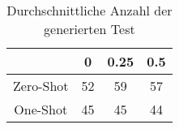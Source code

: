 \bgroup
\def\arraystretch{2}
\begin{table}[H]
	\vspace{.5cm}
	\centering		
	\begin{center}
		\begin{tabular}{|c||c|c|c|}
			\hline 
			& 0 & 0.25 & 0.5 \\
			\hline 
			\hline
			Zero-Shot & 52 & 59 & 57 \\
			\hline
			One-Shot & 45 & 45 & 44 \\
			\hline
		\end{tabular} 
	\end{center}
	\caption{Durchschnittliche Anzahl der generierten Test}
	\label{fig:unit}
	\vspace{-.8cm}
\end{table}
\egroup